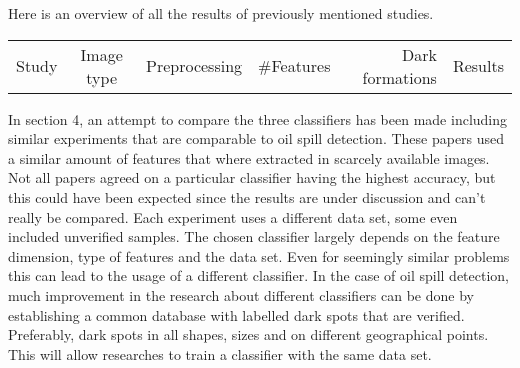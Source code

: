 Here is an overview of all the results of previously mentioned studies.
\begin{tabular}{ l | c | r | r | r | r}
  Study & Image type & Preprocessing & #Features & Dark formations & Results
  \hline			
    
\end{tabular}

In section 4, an attempt to compare the three classifiers has been made including similar experiments that are comparable to oil spill detection. These papers used a similar amount of features that where extracted in scarcely available images. \\ Not all papers agreed on a particular classifier having the highest accuracy, but this could have been expected since the results are under discussion and can't really be compared. Each experiment uses a different data set, some even included unverified samples. The chosen classifier largely depends on the feature dimension, type of features and the data set. Even for seemingly similar problems this can lead to the usage of a different classifier. In the case of oil spill detection, much improvement in the research about different classifiers can be done by establishing a common database with labelled dark spots that are verified. Preferably, dark spots in all shapes, sizes and on different geographical points. This will allow researches to train a classifier with the same data set.